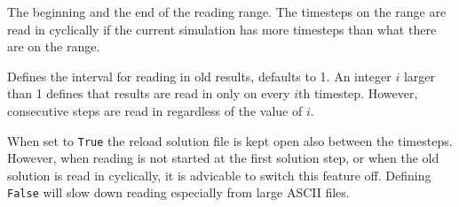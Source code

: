 The beginning and the end of the reading range. The timesteps on the
range are read in cyclically if the current simulation has
more timesteps than what there are on the range. 

Defines the interval for reading in old results, defaults to 1. An
integer $i$ larger than 1 defines that results are read in only on
every $i$th timestep. However, consecutive steps are read in
regardless of the value of $i$.

When set to {\tt True} the reload solution file is kept open also between
the timesteps. However, when reading is not started at the first
solution step, or when the old solution is read in cyclically, it is
advicable to switch this feature off. Defining {\tt False} will slow down
reading especially from large ASCII files. 
\sifend
\sifend

